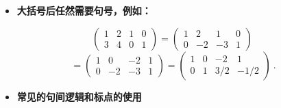 \begin{itemize}
\item \textbf{大括号后任然需要句号，例如：}
\end{itemize}

$$
\left(
    \begin{matrix}
    1&2&1&0\\
    3&4&0&1
    \end{matrix}\right)=\left(
    \begin{matrix}
    1&2&1&0\\
    0&-2&-3&1
    \end{matrix}\right)~$$
    $$
    =\left(
    \begin{matrix}
    1&0&-2&1\\
    0&-2&-3&1
    \end{matrix}\right)=\left(
    \begin{matrix}
    1&0&-2&1\\
    0&1&3/2&-1/2
    \end{matrix}
\right)~.
$$
\begin{itemize}
\item \textbf{常见的句间逻辑和标点的使用}
\end{itemize}

